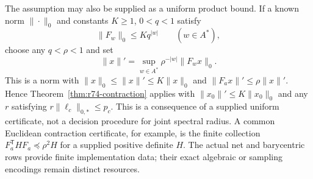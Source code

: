 The assumption may also be supplied as a uniform product bound. If a known
norm $\|\cdot\|_0$ and constants $K\ge1$, $0<q<1$ satisfy
\[
 \|F_w\|_0\le Kq^{|w|}\qquad(w\in A^*),
\]
choose any $q<\rho<1$ and set
\[
 \|x\|'=\sup_{w\in A^*}\rho^{-|w|}\|F_wx\|_0.
\]
This is a norm with $\|x\|_0\le\|x\|'\le K\|x\|_0$ and
$\|F_ax\|'\le\rho\|x\|'$. Hence
Theorem~\ref{thm:r74-contraction} applies with
$\|x_0\|'\le K\|x_0\|_0$ and any $r$ satisfying
$r\|\ell_c\|_{0,*}\le p_c$. This is a consequence of a supplied uniform
certificate, not a decision procedure for joint spectral radius. A common
Euclidean contraction certificate, for example, is the finite collection
$F_a^{\mathsf T}HF_a\preceq\rho^2H$ for a supplied positive definite $H$.
The actual net and barycentric rows provide finite implementation data;
their exact algebraic or sampling encodings remain distinct resources.

